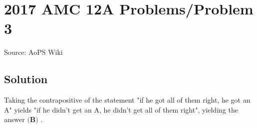 \documentclass[12pt]{article}
\begin{document}
\section*{{2017 AMC 12A Problems/Problem 3}}
Source: AoPS Wiki

\subsection*{Solution}
Taking the contrapositive of the statement "if he got all of them right, he got an A" yields "if he didn't get an A, he didn't get all of them right", yielding the answer $\boxed{\textbf{(B)}}$ .
\end{document}
